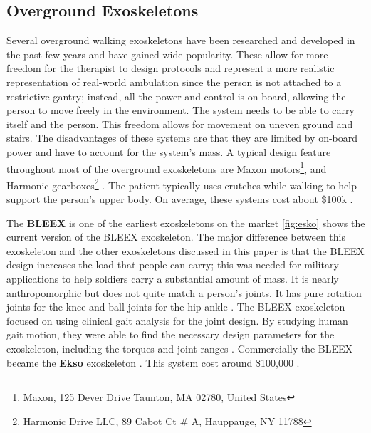 \subsection{Overground Exoskeletons}

Several overground walking exoskeletons have been researched and developed in the past few years and have gained wide popularity. These allow for more freedom for the therapist to design protocols and represent a more realistic representation of real-world ambulation \cite{8110705} since the person is not attached to a restrictive gantry; instead, all the power and control is on-board, allowing the person to move freely in the environment. The system needs to be able to carry itself and the person. This freedom allows for movement on uneven ground and stairs. The disadvantages of these systems are that they are limited by on-board power and have to account for the system's mass. A typical design feature throughout most of the overground exoskeletons are Maxon motors\footnote{Maxon, 125 Dever Drive Taunton, MA 02780, United States}, and Harmonic gearboxes\footnote{Harmonic Drive LLC, 89 Cabot Ct # A, Hauppauge, NY 11788} \cite{bortole2015h2} \cite{aliman2017design}. The patient typically uses crutches while walking to help support the person's upper body. On average, these systems cost about \$100k \cite{rupal2017lower}.


The \textbf{BLEEX} is one of the earliest exoskeletons on the market \autoref{fig:esko} shows the current version of the BLEEX exoskeleton. The major difference between this exoskeleton and the other exoskeletons discussed in this paper is that the BLEEX design increases the load that people can carry; this was needed for military applications to help soldiers carry a substantial amount of mass. It is nearly anthropomorphic but does not quite match a person's joints. It has pure rotation joints for the knee and ball joints for the hip ankle \cite{chu2005biomimetic}\cite{zoss2006biomechanical}. The BLEEX exoskeleton focused on using clinical gait analysis for the joint design. By studying human gait motion, they were able to find the necessary design parameters for the exoskeleton, including the torques and joint ranges \cite{zoss2005mechanical}. Commercially the BLEEX became the \textbf{Ekso} exoskeleton \cite{zoss2016human}. This system cost around \$100,000 \cite{nichols_2018}. 


